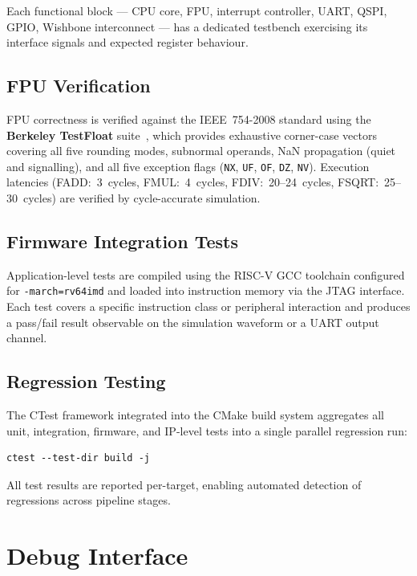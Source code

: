 Each functional block — CPU core, FPU, interrupt controller, UART, QSPI, GPIO,
Wishbone interconnect — has a dedicated testbench exercising its interface signals
and expected register behaviour.

\subsection{FPU Verification}

FPU correctness is verified against the IEEE~754-2008 standard using the
\textbf{Berkeley TestFloat} suite~\cite{hauser2010testfloat}, which provides
exhaustive corner-case vectors covering all five rounding modes, subnormal operands,
NaN propagation (quiet and signalling), and all five exception flags (\texttt{NX},
\texttt{UF}, \texttt{OF}, \texttt{DZ}, \texttt{NV}).  Execution latencies
(FADD:~3~cycles, FMUL:~4~cycles, FDIV:~20--24~cycles, FSQRT:~25--30~cycles) are
verified by cycle-accurate simulation.

\subsection{Firmware Integration Tests}

Application-level tests are compiled using the RISC-V GCC toolchain configured for
\texttt{-march=rv64imd} and loaded into instruction memory via the JTAG interface.
Each test covers a specific instruction class or peripheral interaction and produces
a pass/fail result observable on the simulation waveform or a UART output channel.

\subsection{Regression Testing}

The CTest framework integrated into the CMake build system aggregates all unit,
integration, firmware, and IP-level tests into a single parallel regression run:

\begin{verbatim}
ctest --test-dir build -j
\end{verbatim}

All test results are reported per-target, enabling automated detection of regressions
across pipeline stages.

\section{Debug Interface}

